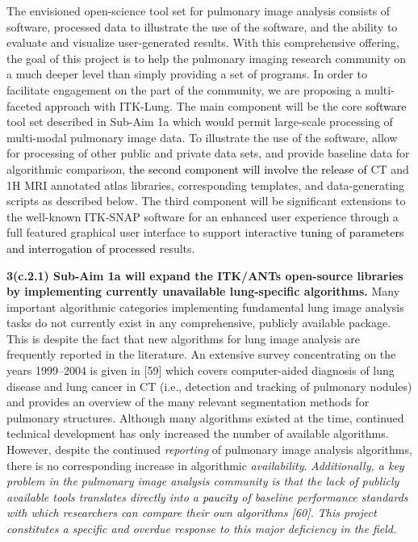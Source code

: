 \documentclass[11pt,]{article}
\begin{document}
The envisioned open-science tool set for pulmonary image analysis
consists of software, processed data to illustrate the use of the
software, and the ability to evaluate and visualize user-generated
results. With this comprehensive offering, the goal of this project is
to help the pulmonary imaging research community on a much deeper level
than simply providing a set of programs. In order to facilitate
engagement on the part of the community, we are proposing a
multi-faceted approach with ITK-Lung. The main component will be the
core \textcolor{black}{software} tool set described in Sub-Aim 1a which
would permit large-scale processing of multi-modal pulmonary image data.
To illustrate the use of the software, allow for processing of other
public and private data sets, and provide baseline data for algorithmic
comparison, \textcolor{black}{the second
component will involve the release of} CT and 1H MRI annotated atlas
libraries, corresponding templates, and data-generating scripts as
described below. The third component will be significant extensions to
the well-known ITK-SNAP software for an enhanced user experience through
a full featured graphical user interface to support interactive
\textcolor{black}{tuning of parameters and interrogation of processed}
results.

\textbf{3(c.2.1) Sub-Aim 1a will expand the ITK/ANTs open-source
libraries by implementing currently unavailable lung-specific
algorithms.} Many important algorithmic categories implementing
fundamental lung image analysis tasks do not currently exist in any
comprehensive, publicly available package. This is despite the fact that
new algorithms for lung image analysis are frequently reported in the
literature. An extensive survey concentrating on the years 1999--2004 is
given in {[}59{]} which covers computer-aided diagnosis of lung disease
and lung cancer in CT (i.e., detection and tracking of pulmonary
nodules) and provides an overview of the many relevant segmentation
methods for pulmonary structures. Although many algorithms existed at
the time, continued technical development has only increased the number
of available algorithms. However, despite the continued \emph{reporting}
of pulmonary image analysis algorithms, there is no corresponding
increase in algorithmic \emph{availability}. \emph{Additionally, a key
problem in the pulmonary image analysis community is that the lack of
publicly available tools translates directly into a
\textcolor{black}{paucity} of baseline performance standards with which
researchers can compare their own algorithms {[}60{]}. This project
constitutes a specific and overdue response to this major deficiency in
the field.}
\end{document}
